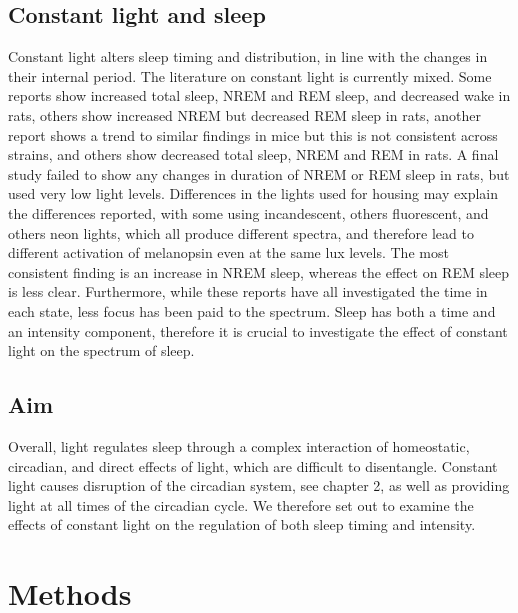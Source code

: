 \subsection{Constant light and sleep}
Constant light alters sleep timing and distribution, in line 
with the changes in their internal period\cite{eastman_circadian_1983}.
The literature on constant light is currently mixed. 
Some reports show increased total sleep, NREM and REM sleep, 
and decreased wake in rats\cite{borbely_circadian_1978, lobo_hypoprolactinemic_1999},
others show increased NREM but decreased REM sleep 
in rats\cite{stephenson_sleep-wake_2012}, another 
report shows a trend to similar findings in mice but
this is not consistent across strains\cite{mitler_sleep_1977}, 
and others show decreased total sleep, NREM and 
REM in rats\cite{fishman_rem_1972}.
A final study failed to show any changes in duration
of NREM or REM sleep in rats, but used 
very low light levels\cite{ikeda_continuous_2000}.
Differences in the lights used for housing may explain the 
differences reported, with some using incandescent\cite{fishman_rem_1972},
others fluorescent\cite{mitler_sleep_1977}, and others 
neon lights\cite{borbely_circadian_1978}, which all produce different
spectra, and therefore lead to different activation of melanopsin 
even at the same lux levels\cite{peirson_light_2018}.
The most consistent finding is an increase in NREM sleep, whereas
the effect on REM sleep is less clear.
Furthermore, while these reports have all investigated the time in each 
state, less focus has been paid to the spectrum.
Sleep has both a time and an intensity component, therefore it 
is crucial to investigate the effect of constant light on the 
spectrum of sleep. 

\subsection{Aim}
Overall, light regulates sleep through a complex interaction of homeostatic,
circadian, and direct effects of light, which are difficult to disentangle.
Constant light causes disruption of the circadian system, see chapter 2, as
well as providing light at all times of the circadian cycle.
We therefore set out to examine the effects of constant 
light on the regulation of both sleep timing and intensity.



\section{Methods}

